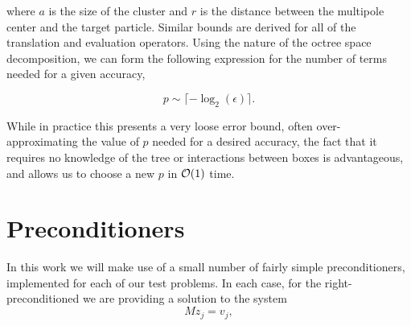 \noindent
where $a$ is the size of the cluster and $r$ is the distance between the multipole center and the target particle. Similar bounds are derived \cite{greengard1987} for all of the translation and evaluation operators. Using the nature of the octree space decomposition, we can form the following expression for the number of terms needed for a given accuracy,

\begin{equation}\label{eqn:fmm_p}
	p \sim \lceil -\log_{2}(\epsilon) \rceil.
\end{equation}

While in practice this presents a very loose error bound, often over-approximating the value of $p$ needed for a desired accuracy, the fact that it requires no knowledge of the tree or interactions between boxes is advantageous, and allows us to choose a new $p$ in $\mathcal{O}(1)$ time.


%
%	
%	

\section{Preconditioners}\label{subsec:preconditioners}

In this work we will make use of a small number of fairly simple preconditioners, implemented for each of our test problems. In each case, for the right-preconditioned {\gmres} we are providing a solution to the system
\begin{equation}
	Mz_j = v_j,
\end{equation}

